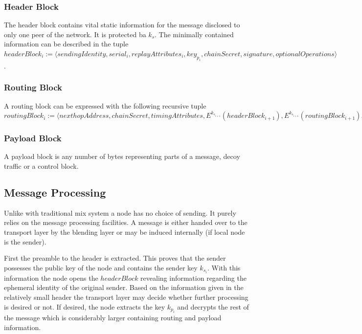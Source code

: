 \documentclass[9pt,journal,compsoc]{IEEEtran}
\begin{document}
\subsubsection{Header Block}
The header block contains vital static information for the message disclosed to only one peer of the network. It is protected ba $k_s$. The minimally contained information can be described in the tuple $headerBlock_i:=\langle sendingIdentity,\allowbreak{} serial_i,\allowbreak{} replayAttributes_i,\allowbreak{} key_{p_i},\allowbreak{} chainSecret,\allowbreak{} signature,\allowbreak{} optionalOperations \rangle$.

\subsubsection{Routing Block}
A routing block can be expressed with the following recursive tuple $routingBlock_i:=\langle\allowbreak{} nexthopAddress,\allowbreak{} chainSecret,\allowbreak{} timingAttributes,\allowbreak{} E^{k_{s_{i+1}}}\left(headerBlock_{i+1}\right),\allowbreak{} E^{k_{s_{i+1}}}\left(routingBlock_{i+1}\right),\allowbreak{} payloadBuildInstructions_i,\allowbreak{} payloadId,\allowbreak{} optionalReplyBlocks \rangle$

\subsubsection{Payload Block}
A payload block is any number of bytes representing parts of a message, decoy traffic or a control block.

\subsection{Message Processing\label{sec:processing}}
Unlike with traditional mix system a node has no choice of sending. It purely relies on the message processing facilities. A message is either handed over to the transport layer by the blending layer or may be induced internally (if local node is the sender). 

First the preamble to the header is extracted. This proves that the sender possesses the public key of the node and contains the sender key $k_{s_i}$. With this information the node opens the $headerBlock$ revealing information regarding the ephemeral identity of the original sender. Based on the information given in the relatively small header the transport layer may decide whether further processing is desired or not. If desired, the node extracts the key $k_{p_i}$ and decrypts the rest of the message which is considerably larger containing routing and payload information.
\end{document}
